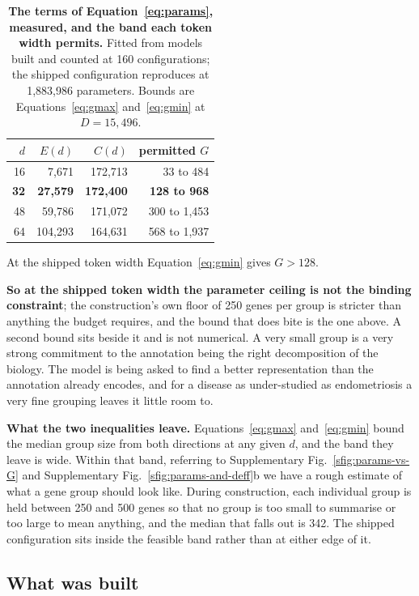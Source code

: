 \begin{table}[b]
\centering
\caption[Measured terms and feasible bands]{\textbf{The terms of
Equation~\ref{eq:params}, measured, and the band each token width permits.}
Fitted from models built and counted at 160 configurations; the shipped
configuration reproduces at 1{,}883{,}986 parameters. Bounds are
Equations~\ref{eq:gmax} and~\ref{eq:gmin} at $D = 15{,}496$.}
\label{stab:terms}
\small
\begin{tabular}{@{}rrrr@{}}
\toprule
$d$ & $E(d)$ & $C(d)$ & permitted $G$ \\
\midrule
16 & 7{,}671 & 172{,}713 & 33 to 484 \\
\textbf{32} & \textbf{27{,}579} & \textbf{172{,}400} & \textbf{128 to 968} \\
48 & 59{,}786 & 171{,}072 & 300 to 1{,}453 \\
64 & 104{,}293 & 164{,}631 & 568 to 1{,}937 \\
\bottomrule
\end{tabular}
\end{table}

At the shipped token width Equation~\ref{eq:gmin} gives $G > 128$.

\textbf{So at the shipped token width the parameter ceiling is not the
binding constraint}; the construction's own floor of 250 genes per group is
stricter than anything the budget requires, and the bound that does bite is
the one above. A second bound sits beside it and is not numerical. A very small group is a
very strong commitment to the annotation being the right decomposition of the
biology. The model is being asked to find a better representation than the
annotation already encodes, and for a disease as under-studied as
endometriosis a very fine grouping leaves it little room to.

\textbf{What the two inequalities leave.} Equations~\ref{eq:gmax}
and~\ref{eq:gmin} bound the median group size from both directions at any
given $d$, and the band they leave is wide. Within that band, referring to 
Supplementary Fig.~\ref{sfig:params-vs-G} and
Supplementary Fig.~\ref{sfig:params-and-deff}b we have a rough estimate of
what a gene group should look like. During construction, each individual group 
is held between 250 and 500 genes so that no group is
too small to summarise or too large to mean anything, and the median that
falls out is 342. The shipped configuration sits inside the feasible band
rather than at either edge of it.

\subsection{What was built}

